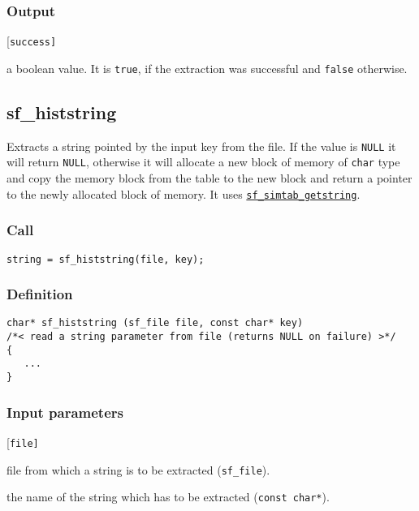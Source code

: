 \subsubsection*{Output}
\begin{desclist}{\tt }{\quad}[\tt success]
   \setlength\itemsep{0pt}
   \item[success] a boolean value. It is \texttt{true}, if the extraction was successful and \texttt{false} otherwise.
\end{desclist}




\subsection{{sf\_histstring}}
Extracts a string pointed by the input key from the file. If the value is \texttt{NULL} it will return \texttt{NULL}, otherwise it will allocate a new block of memory of \texttt{char} type and copy the memory block from the table to the new block and return a pointer to the newly allocated block of memory. It uses \hyperref[sec:sf_simtab_getstring]{\texttt{sf\_simtab\_getstring}}.

\subsubsection*{Call}
\begin{verbatim}string = sf_histstring(file, key);\end{verbatim}

\subsubsection*{Definition}
\begin{verbatim}
char* sf_histstring (sf_file file, const char* key) 
/*< read a string parameter from file (returns NULL on failure) >*/ 
{
   ...
}
\end{verbatim}

\subsubsection*{Input parameters}
\begin{desclist}{\tt }{\quad}[\tt file]
   \setlength\itemsep{0pt}
   \item[file] file from which a string is to be extracted (\texttt{sf\_file}).
   \item[key]  the name of the string which has to be extracted (\texttt{const char*}).
\end{desclist}

